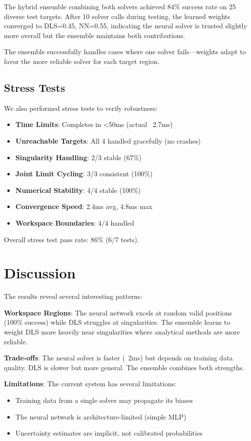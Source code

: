 {{The hybrid ensemble combining both solvers achieved 84\% success rate on 25 diverse test targets. After 10 solver calls during testing, the learned weights converged to DLS=0.45, NN=0.55, indicating the neural solver is trusted slightly more overall but the ensemble maintains both contributions.

The ensemble successfully handles cases where one solver fails—weights adapt to favor the more reliable solver for each target region.

\subsection{Stress Tests}

We also performed stress tests to verify robustness:

\begin{itemize}
    \item \textbf{Time Limits}: Completes in <50ms (actual ~2.7ms)
    \item \textbf{Unreachable Targets}: All 4 handled gracefully (no crashes)
    \item \textbf{Singularity Handling}: 2/3 stable (67\%)
    \item \textbf{Joint Limit Cycling}: 3/3 consistent (100\%)
    \item \textbf{Numerical Stability}: 4/4 stable (100\%)
    \item \textbf{Convergence Speed}: 2.4ms avg, 4.8ms max
    \item \textbf{Workspace Boundaries}: 4/4 handled
\end{itemize}

Overall stress test pass rate: 86\% (6/7 tests).

\section{Discussion}

The results reveal several interesting patterns:

\textbf{Workspace Regions}: The neural network excels at random valid positions (100\% success) while DLS struggles at singularities. The ensemble learns to weight DLS more heavily near singularities where analytical methods are more reliable.

\textbf{Trade-offs}: The neural solver is faster (~2ms) but depends on training data quality. DLS is slower but more general. The ensemble combines both strengths.

\textbf{Limitations}: The current system has several limitations:
\begin{itemize}
    \item Training data from a single solver may propagate its biases
    \item The neural network is architecture-limited (simple MLP)
    \item Uncertainty estimates are implicit, not calibrated probabilities
\end{itemize}

}}
